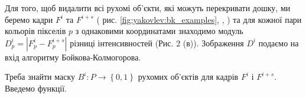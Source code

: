 Для того, щоб видалити всі рухомі об'єкти, які можуть перекривати дошку, ми
беремо кадри \(F^{i}\) та \(F^{i + s}\)  ( рис. \ref{fig:yakovlev:bk_examples}, 
,
) та для
кожної пари кольорів пікселів \(p\) з однаковими координатами знаходимо
модуль \(D_{p}^{i} = \left| F_{p}^{i} - F_{p}^{i + s} \right|\) різниці
інтенсивностей (Рис. 2 (в)). Зображення \(D^{i}\) подаємо на вхід
алгоритму Бойкова-Колмогорова.

Треба знайти маску \(B^{i}:P \rightarrow \left\{ 0,1 \right\}\) рухомих
об'єктів для кадрів \(F^{i}\) і \(F^{i + s}\). 
Введемо функції.